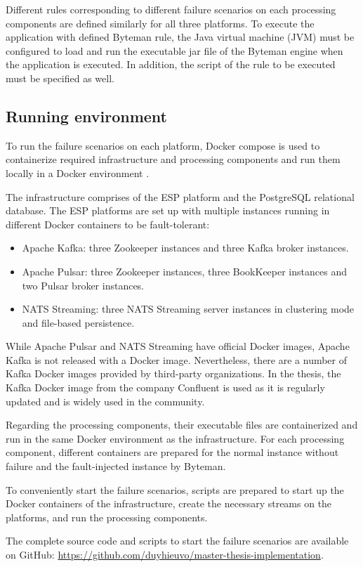 Different rules corresponding to different failure scenarios on each processing components are defined similarly for all three platforms. To execute the application with defined Byteman rule, the Java virtual machine (JVM) must be configured to load and run the executable jar file of the Byteman engine when the application is executed. In addition, the script of the rule to be executed must be specified as well.

 

\subsection{Running environment}
To run the failure scenarios on each platform, Docker compose is used to containerize required infrastructure and processing components and run them locally in a Docker environment \cite{docker}.

The infrastructure comprises of the ESP platform and the PostgreSQL relational database. The ESP platforms are set up with multiple instances running in different Docker containers to be fault-tolerant:
\begin{itemize}
	\item Apache Kafka: three Zookeeper instances and three Kafka broker instances.
	\item Apache Pulsar: three Zookeeper instances, three BookKeeper instances and two Pulsar broker instances.
	\item NATS Streaming: three NATS Streaming server instances in clustering mode and file-based persistence.
\end{itemize}

While Apache Pulsar and NATS Streaming have official Docker images, Apache Kafka is not released with a Docker image. Nevertheless, there are a number of Kafka Docker images provided by third-party organizations. In the thesis, the Kafka Docker image from the company Confluent is used as it is regularly updated and is widely used in the community.

Regarding the processing components, their executable files are containerized and run in the same Docker environment as the infrastructure. For each processing component, different containers are prepared for the normal instance without failure and the fault-injected instance by Byteman. 

To conveniently start the failure scenarios, scripts are prepared to start up the Docker containers of the infrastructure, create the necessary streams on the platforms, and run the processing components.

The complete source code and scripts to start the failure scenarios are available on GitHub: \url{https://github.com/duyhieuvo/master-thesis-implementation}.